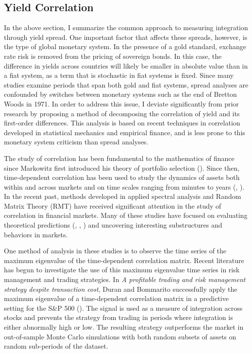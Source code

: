 \documentclass[3p]{elsarticle}
\begin{document}
\subsection{Yield Correlation}
In the above section, I summarize the common approach to measuring integration through yield spread.  One important factor that affects these spreads, however, is the type of global monetary system.  In the presence of a gold standard, exchange rate risk is removed from the pricing of sovereign bonds.  In this case, the difference in yields across countries will likely be smaller in absolute value than in a fiat system, as a term that is stochastic in fiat systems is fixed.  Since many studies examine periods that span both gold and fiat systems, spread analyses are confounded by switches between monetary systems such as the end of Bretton Woods in 1971.  In order to address this issue, I deviate significantly from prior research by proposing a method of decomposing the correlation of yield and its first-order differences.  This analysis is based on recent techniques in correlation developed in statistical mechanics and empirical finance, and is less prone to this monetary system criticism than spread analyses.  

The study of correlation has been fundamental to the mathematics of finance since Markowitz first introduced his theory of portfolio selection (\cite{Markowitz1952}).  Since then, time-dependent correlation has been used to study the dynamics of assets both within and across markets and on time scales ranging from minutes to years (\cite{Drozdz2001}, \cite{Heimo2007}).  In the recent past, methods developed in applied spectral analysis and Random Matrix Theory (RMT) have received significant attention in the study of correlation in financial markets.  Many of these studies have focused on evaluating theoretical predictions (\cite{Laloux1998}, \cite{Laloux2000}, \cite{Conlon2009}) and uncovering interesting substructures and behaviors in markets.  

One method of analysis in these studies is to observe the time series of the maximum eigenvalue of the time-dependent correlation matrix.  Recent literature has begun to investigate the use of this maximum eigenvalue time series in risk management and trading strategies.  In \textit{A profitable trading and risk management strategy despite transaction cost}, Duran and Bommarito successfully apply the maximum eigenvalue of a time-dependent correlation matrix in a predictive setting for the S\&P 500 (\cite{Duran2010}).  The signal is used as a measure of integration across stocks and prevents the strategy from trading in periods where integration is either abnormally high or low.  The resulting strategy outperforms the market in out-of-sample Monte Carlo simulations with both random subsets of assets on random sub-periods of the dataset.
\end{document}
